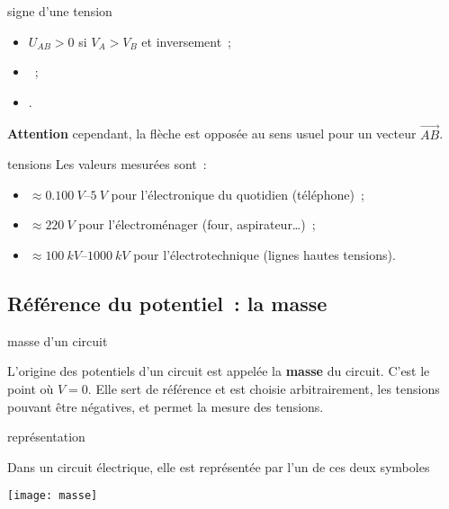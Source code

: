 \documentclass[../main/main.tex]{subfiles}
\begin{document}
\begin{tcbraster}[raster columns=2, raster equal height=rows]
    \begin{impl}[label=impl:tension]{signe d'une tension}

        \begin{itemize}
            \item $U_{AB} > 0$ si $V_A > V_B$ et inversement~;
            \item {}~;
            \item {}.
        \end{itemize}

        \textbf{Attention} cependant, la flèche est opposée au sens usuel pour
        un vecteur $\overrightarrow{AB}$.

    \end{impl}
    \begin{odgr}[label=odgr:tensions]{tensions}
        Les valeurs mesurées sont~:

        \begin{itemize}
            \item $\approx \SIrange{0.100}{5}{V}$ pour l'électronique du
                quotidien (téléphone)~;
            \item $\approx \SI{220}{V}$ pour l'électroménager (four,
                aspirateur…)~;
            \item $\approx \SIrange{100}{1000}{kV}$ pour l'électrotechnique
                (lignes hautes tensions).
        \end{itemize}

    \end{odgr}
\end{tcbraster}

\subsection{Référence du potentiel~: la masse}

\begin{tcbraster}[raster columns=2, raster equal height=rows]
    \begin{defi}[label=def:masse]{masse d'un circuit}

        L'origine des potentiels d'un circuit est appelée la \textbf{masse} du
        circuit. C'est le point où $V = 0$. Elle sert de référence et est
        choisie arbitrairement, les tensions pouvant être négatives, et permet
        la mesure des tensions.

    \end{defi}
    \begin{nota}[label=nota:masse]{représentation}

        Dans un circuit électrique, elle est représentée par l'un de ces deux
        symboles

        \begin{center}
            \texttt{[image: masse]}
        \end{center}
    \end{nota}
\end{tcbraster}
\end{document}
